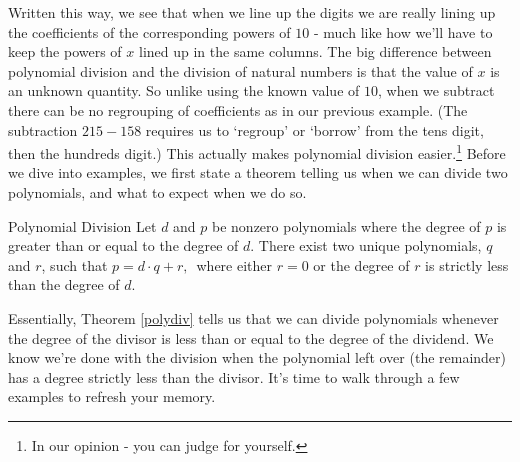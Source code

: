 \setlength\arraycolsep{5pt}
\setlength\extrarowheight{0pt}

Written this way, we see that when we line up the digits we are really lining up the coefficients of the corresponding powers of $10$ - much like how we'll have to keep the powers of $x$ lined up in the same columns.  The big difference between polynomial division and the division of natural numbers is that the value of $x$ is an unknown quantity.  So unlike using the known value of $10$, when we subtract there can be no regrouping of coefficients as in our previous example. (The subtraction $215 - 158$ requires us to `regroup' or `borrow' from the tens digit, then the hundreds digit.) This actually makes polynomial division easier.\footnote{In our opinion - you can judge for yourself.}  Before we dive into examples, we first state a theorem telling us when we can divide two polynomials, and what to expect when we do so.

\begin{theorem1}[polydiv]{Polynomial Division} Let $d$ and $p$ be nonzero polynomials where the degree of $p$ is greater than or equal to the degree of $d$.  There exist two unique polynomials, $q$ and $r$, such that $p = d \cdot q + r,\,$ where either $r = 0$ or the degree of $r$ is strictly less than the degree of $d$.
\end{theorem1}

Essentially, Theorem \ref{polydiv} tells us that we can divide polynomials whenever the degree of the divisor is less than or equal to the degree of the dividend.  We know we're done with the division when the polynomial left over (the remainder) has a degree strictly less than the divisor.  It's time to walk through a few examples to refresh your memory.

